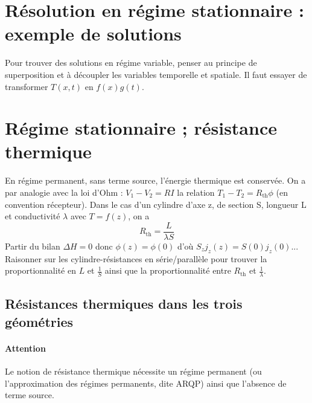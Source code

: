\documentclass[french]{book}
\theoremstyle{plain}
\theoremstyle{definition}
\theoremstyle{remark}
\begin{document}
\section{Résolution en régime stationnaire : exemple de solutions}
Pour trouver des solutions en régime variable, penser au principe de superposition et à découpler les variables temporelle et spatiale. Il faut essayer de transformer $T(x,t)$ en $f(x)g(t)$.
\section{Régime stationnaire ; résistance thermique}
En régime permanent, sans terme source, l’énergie thermique est conservée. On a par analogie avec la loi d’Ohm : $V_1-V_2=RI$ la relation $T_1-T_2=R_\text{th}\phi$ (en convention récepteur). Dans le cas d’un cylindre d’axe z, de section S, longueur L et conductivité $\lambda$ avec $T=f(z)$, on a $$R_\text{th}=\frac{L}{\lambda S}$$
Partir du bilan $\Delta H=0$ donc $\phi(z)=\phi(0)$ d’où $S_zj_z(z)=S(0)j_z(0)$...
Raisonner sur les cylindre-résistances en série/parallèle pour trouver la proportionnalité en $L$ et $\displaystyle\frac{1}{S}$ ainsi que la proportionnalité entre $R_\text{th}$ et $\displaystyle\frac{1}{\lambda}$.
\subsection{Résistances thermiques dans les trois géométries}
\paragraph{Attention} Le notion de résistance thermique nécessite un régime permanent (ou l'approximation des régimes permanents, dite ARQP) ainsi que l'absence de terme source.
\end{document}
